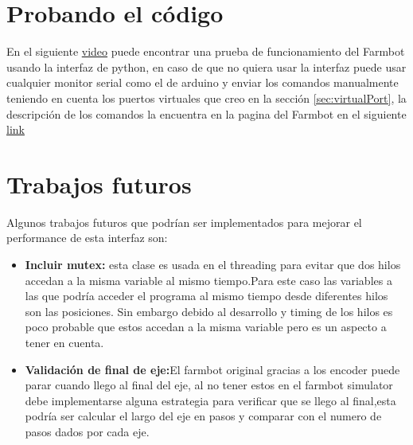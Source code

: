 \documentclass[letterpaper,12pt]{article}
\begin{document}
	\section{Probando el código}
	En el siguiente \href{URL}{video} puede encontrar una prueba de funcionamiento del Farmbot usando la interfaz de python, en caso de que no quiera usar la interfaz puede usar cualquier monitor serial como el de arduino y enviar los comandos manualmente teniendo en cuenta los puertos virtuales que creo en la sección \ref{sec:virtualPort}, la descripción de los comandos la encuentra en la pagina del Farmbot en el siguiente \href{URL}{link}
	\section{Trabajos futuros}
	Algunos trabajos futuros que podrían ser implementados para mejorar el performance de esta interfaz son: 
	\begin{itemize}
		\item \textbf{Incluir mutex:} esta clase es usada en el threading para evitar que dos hilos accedan a la misma variable al mismo tiempo.Para este caso las variables a las que podría acceder el programa al mismo tiempo desde diferentes hilos  son las posiciones. Sin embargo debido al desarrollo y timing de los hilos es poco probable que estos accedan a la misma variable pero es un aspecto a tener en cuenta.
		\item \textbf{Validación de final de eje:}El farmbot original gracias a los encoder puede parar cuando llego al final del eje, al no tener estos en el farmbot simulator debe implementarse alguna estrategia para verificar que se llego al final,esta podría ser calcular el largo del eje en pasos y comparar con el numero de pasos dados por cada eje.
	\end{itemize}
\end{document}
